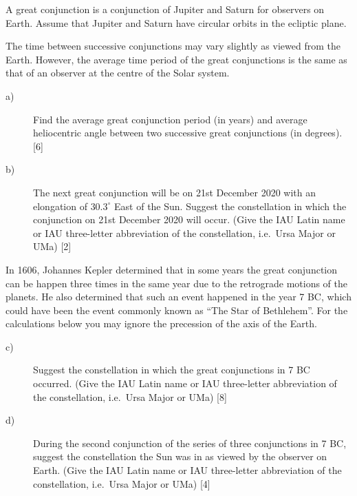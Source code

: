 A great conjunction is a conjunction of Jupiter and Saturn for observers on
Earth. Assume that Jupiter and Saturn have circular orbits in the ecliptic
plane.

The time between successive conjunctions may vary slightly as viewed from the
Earth. However, the average time period of the great conjunctions is the same
as that of an observer at the centre of the Solar system.

\begin{description}
\item[a)] Find the average great conjunction period (in years) and average
  heliocentric angle between two successive great conjunctions (in degrees).
  \hfill[6]
\item[b)] The next great conjunction will be on 21st December 2020 with an
  elongation of $30.3^\circ$ East of the Sun. Suggest the constellation in
  which the conjunction on 21st December 2020 will occur. (Give the IAU Latin
  name or IAU three-letter abbreviation of the constellation, i.e.\ Ursa Major
  or UMa) \hfill[2]
\end{description}

In 1606, Johannes Kepler determined that in some years the great conjunction
can be happen three times in the same year due to the retrograde motions of
the planets. He also determined that such an event happened in the year 7 BC,
which could have been the event commonly known as ``The Star of Bethlehem''.
For the calculations below you may ignore the precession of the axis of the
Earth.

\begin{description}
\item[c)] Suggest the constellation in which the great conjunctions in 7 BC
  occurred. (Give the IAU Latin name or IAU three-letter abbreviation of the
  constellation, i.e.\ Ursa Major or UMa) \hfill[8]
\item[d)] During the second conjunction of the series of three conjunctions
  in 7 BC, suggest the constellation the Sun was in as viewed by the observer
  on Earth. (Give the IAU Latin name or IAU three-letter abbreviation of the
  constellation, i.e.\ Ursa Major or UMa) \hfill[4]
\end{description}
